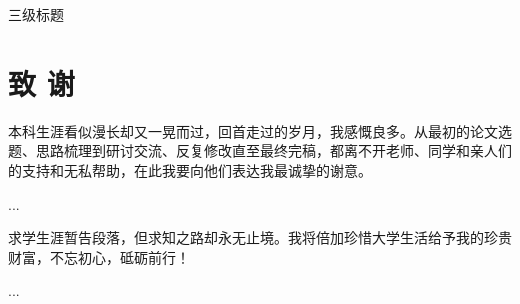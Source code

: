 \documentclass[openany,oneside]{book}
\begin{document}
三级标题


\clearpage
{}
{}


\chapter*{致 \qquad 谢}
\thispagestyle{empty}
本科生涯看似漫长却又一晃而过，回首走过的岁月，我感慨良多。从最初的论文选题、思路梳理到研讨交流、反复修改直至最终完稿，都离不开老师、同学和亲人们的支持和无私帮助，在此我要向他们表达我最诚挚的谢意。

...

求学生涯暂告段落，但求知之路却永无止境。我将倍加珍惜大学生活给予我的珍贵财富，不忘初心，砥砺前行！
\thispagestyle{empty}

...
\end{document}
